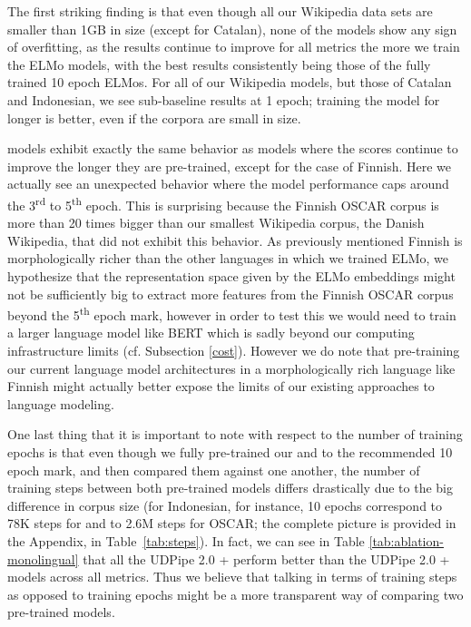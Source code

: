 The first striking finding is that even though all our Wikipedia data sets are smaller than 1GB in size (except for Catalan), none of the \elmowiki models show any sign of overfitting, as the results continue to improve for all metrics the more we train the ELMo models, with the best results consistently being those of the fully trained 10 epoch ELMos. For all of our Wikipedia models, but those of Catalan and Indonesian, we see sub-baseline results at 1 epoch; training the model for longer is better, even if the corpora are small in size.

\elmooscar models exhibit exactly the same behavior as \elmowiki models where the scores continue to improve the longer they are pre-trained, except for the case of Finnish. Here we actually see an unexpected behavior where the model performance caps around the 3\textsuperscript{rd} to 5\textsuperscript{th} epoch. This is surprising because the Finnish OSCAR corpus is more than 20 times bigger than our smallest Wikipedia corpus, the Danish Wikipedia, that did not exhibit this behavior. As previously mentioned Finnish is morphologically richer than the other languages in which we trained ELMo, we hypothesize that the representation space given by the ELMo embeddings might not be sufficiently big to extract more features from the Finnish OSCAR corpus beyond the 5\textsuperscript{th} epoch mark, however in order to test this we would need to train a larger language model like BERT which is sadly beyond our computing infrastructure limits (cf. Subsection \ref{cost}). However we do note that pre-training our current language model architectures in a morphologically rich language like Finnish might actually better expose the limits of our existing approaches to language modeling.

One last thing that it is important to note with respect to the number of training epochs is that even though we fully pre-trained our \elmowikis and \elmooscars to the recommended 10 epoch mark, and then compared them against one another, the number of training steps between both pre-trained models differs drastically due to the big difference in corpus size (for Indonesian, for instance, 10 epochs correspond to 78K steps for \elmowiki and to 2.6M steps for OSCAR; the complete picture is provided in the Appendix, in Table~\ref{tab:steps}). In fact, we can see in Table \ref{tab:ablation-monolingual} that all the UDPipe 2.0 + \elmooscarone perform better than the UDPipe 2.0 + \elmowikione models across all metrics. Thus we believe that talking in terms of training steps as opposed to training epochs might be a more transparent way of comparing two pre-trained models.

